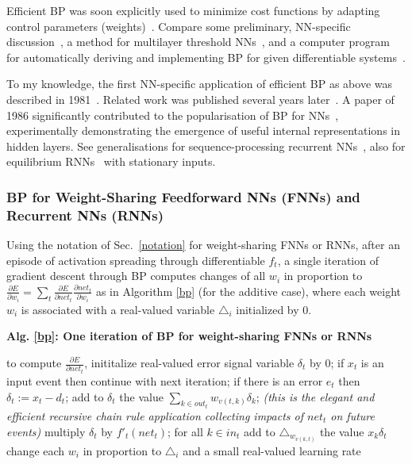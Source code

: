 \documentclass[letterpaper]{article}
\begin{document}
\begin{CJK*}{UTF8}{gbsn}
Efficient BP was soon explicitly used to minimize cost functions by
adapting control parameters (weights)~\citep{dreyfus:1973}.
Compare some preliminary, NN-specific discussion~\citep[section 5.5.1]{Werbos:74}, 
a method for multilayer threshold NNs~\citep{bobrowski78},
and a computer program for automatically deriving and implementing BP 
for given differentiable systems~\citep{SPEELPENNING80A}.


To my knowledge, the first NN-specific application of
efficient BP as above was described in 1981~\citep{Werbos:81sensitivity,werbos2006backwards}.
Related work was published several  years later~\citep{Parker:85,LeCun:85,lecun-88}.
A paper of 1986 significantly contributed to the popularisation of BP for NNs~\citep{Rumelhart:86}, experimentally demonstrating the emergence of useful 
internal representations in hidden layers. 
See generalisations for sequence-processing 
recurrent NNs~\citep[e.g.,][]{Williams:89,RobinsonFallside:87tr,Werbos:88gasmarket,WilliamsZipser:88,WilliamsZipser:89nc,WilliamsZipser:89cs,Rohwer:89,Pearlmutter:89,Gherrity:89,WilliamsPeng:90,Schmidhuber:92ncn3,Pearlmutter:95,baldi95,kremer2001,atiya2000}, also for equilibrium RNNs~\citep{Almeida:87,Pineda:87} with stationary inputs.

\subsubsection{BP for Weight-Sharing Feedforward NNs (FNNs) and Recurrent NNs (RNNs)}
\label{bpsec}

Using the notation of Sec.~\ref{notation} for weight-sharing FNNs or RNNs, 
after an episode of activation spreading through differentiable $f_t$, 
a single iteration of gradient descent through BP computes
changes of all $w_i$ in proportion to 
$
\frac{\partial E}{\partial w_i}=
\sum_t
\frac{\partial E}{\partial net_t}
\frac{\partial net_t}{\partial w_i}
$ 
as in Algorithm \ref{bp} (for the additive case),
where each weight $w_i$ is associated with a real-valued variable $\triangle_i$ initialized by 0.

\begin{algorithm}{\bf Alg. \ref{bp}: One iteration  of BP for weight-sharing FNNs or RNNs} 
\label{bp}
\begin{algorithmic}
\STATE to compute $\frac{\partial E}{\partial net_t}$, inititalize real-valued error signal variable $\delta_t$ by 0;
\STATE if $x_t$ is an input event then continue with next iteration;
\STATE if there is an error $e_t$ then $\delta_t := x_t-d_t$;
\STATE add to $\delta_t$ the value $\sum_{k \in out_t}  w_{v(t,k)} \delta_k$;
{\em (this is the elegant and efficient recursive chain rule
application collecting impacts of $net_t$ on future events)} 
\STATE multiply  $\delta_t$ by $f'_t(net_t)$;
\STATE for all $k \in in_t$ add to  $\triangle_{w_{v(k,t)}}$ the value $x_k \delta_t$
\ENDFOR
\STATE change each $w_i$ in proportion to $\triangle_i$ and a small real-valued learning rate
\end{algorithmic}
\end{algorithm}


\end{CJK*}
\end{document}
